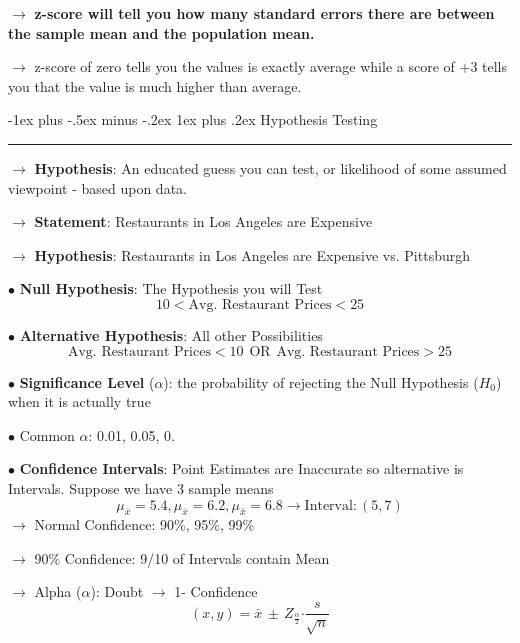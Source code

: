 \documentclass[letterpaper, 10.5pt,landscape]{article}
\makeatletter
\renewcommand{\subsubsection}{\@startsection{subsubsection}{3}{0mm}%
                                {-1ex plus -.5ex minus -.2ex}%
                                {1ex plus .2ex}%
                                {\normalfont\small\bfseries}}
\makeatother
\begin{document}
\begin{multicols*}{3}
$\rightarrow$ \textbf{z-score will tell you how many standard errors there are between the sample mean and the population mean.} 





$\rightarrow$  z-score of zero tells you the values is exactly average while a score of +3 tells you that the value is much higher than average. \\
\vspace{3pt}


\subsubsection{Hypothesis Testing} {\color{teal}\hrule height 0.5pt} \smallskip

$\rightarrow$ \textbf{Hypothesis}: An educated guess you can test, or likelihood of some assumed viewpoint - based upon data. 

$\rightarrow$ \textbf{Statement}: Restaurants in Los Angeles are Expensive

$\rightarrow$ \textbf{Hypothesis}: Restaurants in Los Angeles are Expensive vs. Pittsburgh

$\bullet$ \textbf{Null Hypothesis}: The Hypothesis you will Test 
\[10 < \text{Avg. Restaurant Prices} < 25\]

$\bullet$ \textbf{Alternative Hypothesis}: All other Possibilities 
\[\text{Avg. Restaurant Prices} < 10 \hspace{5pt} \text{OR} \hspace{5pt} \text{Avg. Restaurant Prices} > 25 \]


$\bullet$ \textbf{Significance Level} ($\alpha$): the probability of rejecting the Null Hypothesis ($H_{0}$) when it is actually true 
\vspace{2pt}

$\bullet$ Common $\alpha$: 0.01, 0.05, 0.
\vspace{2pt}

$\bullet$ \textbf{Confidence Intervals}: Point Estimates are Inaccurate so alternative is Intervals. Suppose we have 3 sample means
\vspace{-4pt}
\[\boxed{\mu_{\bar{x}} = 5.4, \mu_{\bar{x}} = 6.2, \mu_{\bar{x}} = 6.8 \rightarrow \text{Interval}: (5,7)} \]
$\rightarrow$ Normal Confidence: 90\%, 95\%, 99\%

$\rightarrow$ 90\% Confidence: 9/10 of Intervals contain Mean
 
$\rightarrow$ Alpha ($\alpha$): Doubt $\rightarrow$ 1- Confidence
\vspace{-3pt}
\[\boxed{ (x,y) =  \bar{x} \, \pm \hspace{2pt} Z_{\frac{\alpha}{2}} \boldsymbol{\cdot} \frac{s}{\sqrt{n}}} \]


\end{multicols*}
\end{document}

